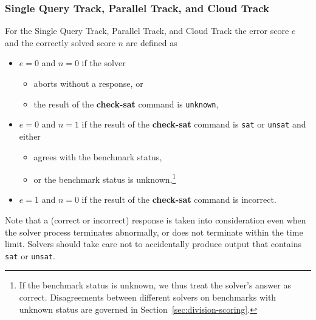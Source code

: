\documentclass[12pt]{article}
\newcommand{\akey}[1]{\textbf{#1}\xspace}
\newcommand{\maintrack}{Single Query Track\xspace}
\newcommand{\paralleltrack}{Parallel Track\xspace}
\newcommand{\cloudtrack}{Cloud Track\xspace}
\begin{document}
\subsubsection{\maintrack, \paralleltrack, and \cloudtrack}
  For the \maintrack, \paralleltrack, and \cloudtrack the error score
  $e$ and the correctly solved score $n$ are defined as
  \begin{itemize}
  \item $e=0$ and $n=0$ if the solver
    \begin{itemize}[noitemsep,nolistsep]
      \item aborts without a response, or
      \item  the result of the \akey{check-sat} command is \texttt{unknown},
    \end{itemize}
  \item $e=0$ and $n=1$ if the result of the \akey{check-sat} command is
      \texttt{sat} or \texttt{unsat} and either
    \begin{itemize}[noitemsep,nolistsep]
      \item agrees with the benchmark status,
      \item or the benchmark status
        is unknown,\footnote{If the benchmark status is unknown, we thus treat
        the solver's answer as correct.  Disagreements between different
        solvers on benchmarks with unknown status are governed in
        Section~\ref{sec:division-scoring}.}
    \end{itemize}
  \item $e=1$ and $n=0$ if the result of the \akey{check-sat} command is
    incorrect.
  \end{itemize}
%
Note that a (correct or incorrect) response is taken into
consideration even when the solver process terminates abnormally, or
does not terminate within the time limit.  Solvers should take care
not to accidentally produce output that contains \texttt{sat} or
\texttt{unsat}.
\end{document}

